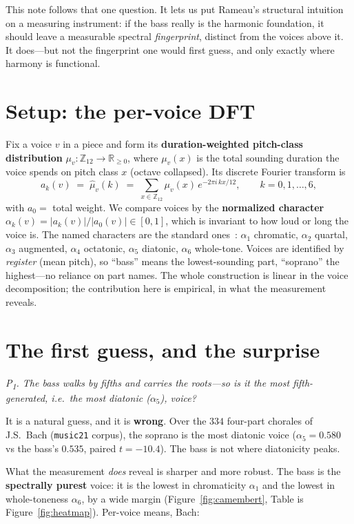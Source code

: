 \documentclass[11pt]{article}
\newcommand{\lean}[1]{\texttt{#1}}
\newcommand{\Ztwelve}{\mathbb{Z}_{12}}
\newcommand{\question}[1]{\smallskip\noindent\textit{#1}\smallskip}
\begin{document}
This note follows that one question. It lets us put Rameau's structural intuition on a measuring
instrument: if the bass really is the harmonic foundation, it should leave a measurable spectral
\emph{fingerprint}, distinct from the voices above it. It does---but not the fingerprint one would first
guess, and only exactly where harmony is functional.

\section{Setup: the per-voice DFT}\label{sec:setup}

Fix a voice $v$ in a piece and form its \textbf{duration-weighted pitch-class distribution}
$\mu_v:\Ztwelve\to\mathbb{R}_{\ge 0}$, where $\mu_v(x)$ is the total sounding duration the voice spends on
pitch class $x$ (octave collapsed). Its discrete Fourier transform is
\[
  a_k(v)\;=\;\hat\mu_v(k)\;=\;\sum_{x\in\Ztwelve}\mu_v(x)\,e^{-2\pi i\,kx/12},\qquad k=0,1,\dots,6,
\]
with $a_0=$ total weight. We compare voices by the \textbf{normalized character}
$\alpha_k(v)=|a_k(v)|/|a_0(v)|\in[0,1]$, which is invariant to how loud or long the voice is. The named
characters are the standard ones~\cite{Amiot,Yust2019}: $\alpha_1$ chromatic, $\alpha_2$ quartal,
$\alpha_3$ augmented, $\alpha_4$ octatonic, $\alpha_5$ diatonic, $\alpha_6$ whole-tone. Voices are
identified by \emph{register} (mean pitch), so ``bass'' means the lowest-sounding part, ``soprano'' the
highest---no reliance on part names. The whole construction is linear in the voice decomposition; the
contribution here is empirical, in what the measurement reveals.

\section{The first guess, and the surprise}\label{sec:law}

\question{P\textsubscript{1}. The bass walks by fifths and carries the roots---so is it the most
fifth-generated, i.e.\ the most \emph{diatonic} ($\alpha_5$), voice?}

It is a natural guess, and it is \textbf{wrong}. Over the $334$ four-part chorales of J.S.~Bach
(\lean{music21} corpus), the soprano is the most diatonic voice ($\alpha_5=0.580$ vs the bass's $0.535$,
paired $t=-10.4$). The bass is not where diatonicity peaks.

What the measurement \emph{does} reveal is sharper and more robust. The bass is the \textbf{spectrally
purest} voice: it is the lowest in chromaticity $\alpha_1$ and the lowest in whole-toneness $\alpha_6$, by
a wide margin (Figure~\ref{fig:camembert}, Table is Figure~\ref{fig:heatmap}). Per-voice means, Bach:
\end{document}
